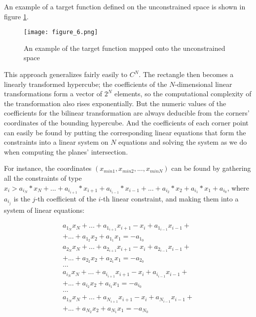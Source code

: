 \documentclass[
	a4paper, %
	10pt, %
	unnumberedsections, %
	twoside, %
]{LTJournalArticle}
\begin{document}
An example of a target function defined on the unconstrained space is shown in figure \ref{fig:unconstrained}.

\begin{figure} 
	\texttt{[image: figure\_6.png]}
	\caption{An example of the target function mapped onto the unconstrained space}
	\label{fig:unconstrained}
\end{figure}

This approach generalizes fairly easily to $C^N$. The rectangle then becomes a linearly transformed hypercube; the coefficients of the $N$-dimensional linear transformations form a vector of $2^N$ elements, so the computational complexity of the transformation also rises exponentially. But the numeric values of the coefficients for the bilinear transformation are always deducible from the corners' coordinates of the bounding hypercube. And the coefficients of each corner point can easily be found by putting the corresponding linear equations that form the constraints into a linear system on $N$ equations and solving the system as we do when computing the planes' intersection.

For instance, the coordinates $(x_{min1}, x_{min2}, ..., x_{minN})$ can be found by gathering all the constraints of type $x_i > a_{i_N}*x_N + ... + a_{i_{i+1}}*x_{i+1} + a_{i_{i-1}}*x_{i-1} + ... + a_{i_2}*x_2 + a_{i_1}*x_1 + a_{i_0}$, where $a_{i_j}$ is the $j$-th coefficient of the $i$-th linear constraint, and making them into a system of linear equations:

\begin{equation}
	\begin{array}{cc}
a_{1_N}x_N + ... + a_{1_{i+1}}x_{i+1} - x_i + a_{1_{i-1}}x_{i-1} + \\ 
+ ... + a_{1_2}x_2 + a_{1_1}x_1 = -a_{1_0} \\
a_{2_N}x_N + ... + a_{2_{i+1}}x_{i+1} - x_i + a_{2_{i-1}}x_{i-1} + \\ 
+ ... + a_{2_2}x_2 + a_{2_1}x_1 = -a_{2_0} \\
... \\
a_{i_N}x_N + ... + a_{i_{i+1}}x_{i+1} - x_i + a_{i_{i-1}}x_{i-1} + \\ 
+ ... + a_{i_2}x_2 + a_{i_1}x_1 = -a_{i_0} \\
... \\
a_{1_N}x_N + ... + a_{N_{i+1}}x_{i+1} - x_i + a_{N_{i-1}}x_{i-1} + \\ 
+ ... + a_{N_2}x_2 + a_{N_1}x_1 = -a_{N_0} \\
	\end{array}
	\label{eq:nd_corner}
\end{equation}
\end{document}
